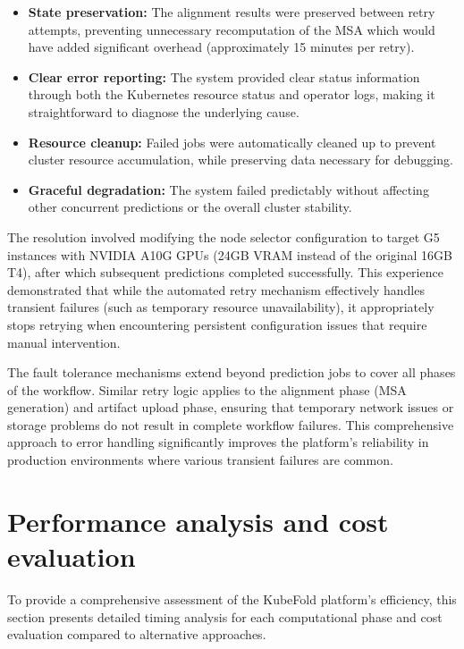 \begin{itemize}
    \item \textbf{State preservation:} The alignment results were preserved between retry attempts, preventing unnecessary recomputation of the MSA which would have added significant overhead (approximately 15 minutes per retry).
    
    \item \textbf{Clear error reporting:} The system provided clear status information through both the Kubernetes resource status and operator logs, making it straightforward to diagnose the underlying cause.
    
    \item \textbf{Resource cleanup:} Failed jobs were automatically cleaned up to prevent cluster resource accumulation, while preserving data necessary for debugging.
    
    \item \textbf{Graceful degradation:} The system failed predictably without affecting other concurrent predictions or the overall cluster stability.
\end{itemize}

The resolution involved modifying the node selector configuration to target G5 instances with NVIDIA A10G GPUs (24GB VRAM instead of the original 16GB T4), after which subsequent predictions completed successfully. This experience demonstrated that while the automated retry mechanism effectively handles transient failures (such as temporary resource unavailability), it appropriately stops retrying when encountering persistent configuration issues that require manual intervention.

The fault tolerance mechanisms extend beyond prediction jobs to cover all phases of the workflow. Similar retry logic applies to the alignment phase (MSA generation) and artifact upload phase, ensuring that temporary network issues or storage problems do not result in complete workflow failures. This comprehensive approach to error handling significantly improves the platform's reliability in production environments where various transient failures are common.

\section{Performance analysis and cost evaluation}

To provide a comprehensive assessment of the KubeFold platform's efficiency, this section presents detailed timing analysis for each computational phase and cost evaluation compared to alternative approaches.

